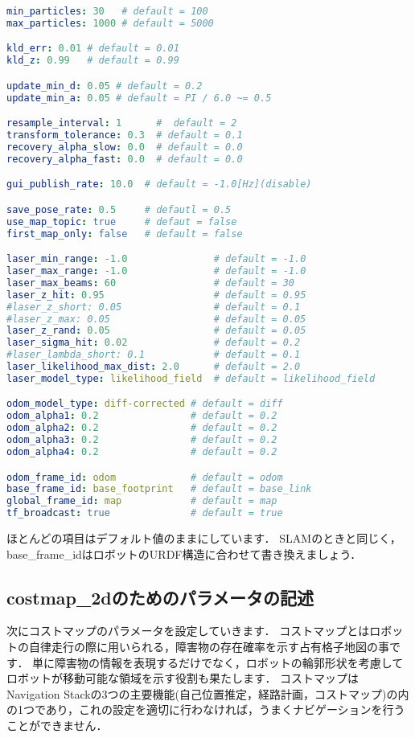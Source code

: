 \documentclass[{../../master}]{subfiles}
\begin{document}
\begin{lstlisting}[language=YAML, label=code:amcl_yml, caption=\textsf{amcl.yml}]
min_particles: 30   # default = 100
max_particles: 1000 # default = 5000

kld_err: 0.01 # default = 0.01
kld_z: 0.99   # default = 0.99

update_min_d: 0.05 # default = 0.2
update_min_a: 0.05 # default = PI / 6.0 ~= 0.5

resample_interval: 1      #  default = 2
transform_tolerance: 0.3  # default = 0.1
recovery_alpha_slow: 0.0  # default = 0.0
recovery_alpha_fast: 0.0  # default = 0.0

gui_publish_rate: 10.0  # default = -1.0[Hz](disable)

save_pose_rate: 0.5     # defautl = 0.5
use_map_topic: true     # defaut = false
first_map_only: false   # default = false

laser_min_range: -1.0               # default = -1.0
laser_max_range: -1.0               # default = -1.0
laser_max_beams: 60                 # default = 30
laser_z_hit: 0.95                   # default = 0.95
#laser_z_short: 0.05                # default = 0.1
#laser_z_max: 0.05                  # default = 0.05
laser_z_rand: 0.05                  # default = 0.05
laser_sigma_hit: 0.02               # default = 0.2
#laser_lambda_short: 0.1            # default = 0.1
laser_likelihood_max_dist: 2.0      # default = 2.0
laser_model_type: likelihood_field  # default = likelihood_field

odom_model_type: diff-corrected # default = diff
odom_alpha1: 0.2                # default = 0.2
odom_alpha2: 0.2                # default = 0.2
odom_alpha3: 0.2                # default = 0.2
odom_alpha4: 0.2                # default = 0.2

odom_frame_id: odom             # default = odom
base_frame_id: base_footprint   # default = base_link
global_frame_id: map            # default = map
tf_broadcast: true              # default = true
\end{lstlisting}

ほとんどの項目はデフォルト値のままにしています．
SLAMのときと同じく，\textsf{base\_frame\_id}はロボットのURDF構造に合わせて書き換えましょう．

\subsection{\textsf{costmap\_2d}のためのパラメータの記述}

次にコストマップのパラメータを設定していきます．
コストマップとはロボットの自律走行の際に用いられる，障害物の存在確率を示す占有格子地図の事です．
単に障害物の情報を表現するだけでなく，ロボットの輪郭形状を考慮してロボットが移動可能な領域を示す役割も果たします．
コストマップはNavigation Stackの3つの主要機能(自己位置推定，経路計画，コストマップ)の内の1つであり，これの設定を適切に行わなければ，うまくナビゲーションを行うことができません．
\end{document}
